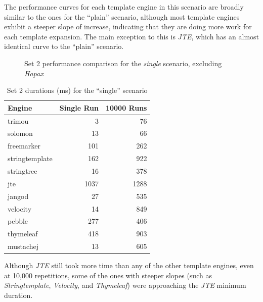 The performance curves for each \gls{template engine} in this scenario are broadly similar to the ones for the \enquote{plain} scenario, although most \gls{template engine}s exhibit a steeper slope of increase, indicating that they are doing more work for each template expansion. The main exception to this is \emph{JTE}, which has an almost identical curve to the \enquote{plain} scenario.

\begin{figure}[!p]
\centering

\caption{\label{multi:set2-single}Set 2 performance comparison for the \emph{single} scenario, excluding \emph{Hapax}}
\end{figure}

\begin{table}[!p]
\centering
\begin{tabular}{lrr}
\textbf{Engine} & \textbf{Single Run} & \textbf{10000 Runs} \\
\hline
trimou & 3 & 76 \\
solomon & 13 & 66 \\
freemarker & 101 & 262 \\
stringtemplate & 162 & 922 \\
stringtree & 16 & 378 \\
jte & 1037 & 1288 \\
jangod & 27 & 535 \\
velocity & 14 & 849 \\
pebble & 277 & 406 \\
thymeleaf & 418 & 903 \\
mustachej & 13 & 605 \\
\end{tabular}
\caption{Set 2 durations (ms) for the \enquote{single} scenario\label{w2:results:single}}
\end{table}

\label{A152}
Although \emph{JTE} still took more time than any of the other \gls{template engine}s, even at 10,000 repetitions, some of the ones with steeper slopes (such as \emph{Stringtemplate}, \emph{Velocity}, and \emph{Thymeleaf}) were approaching the \emph{JTE} minimum duration.

